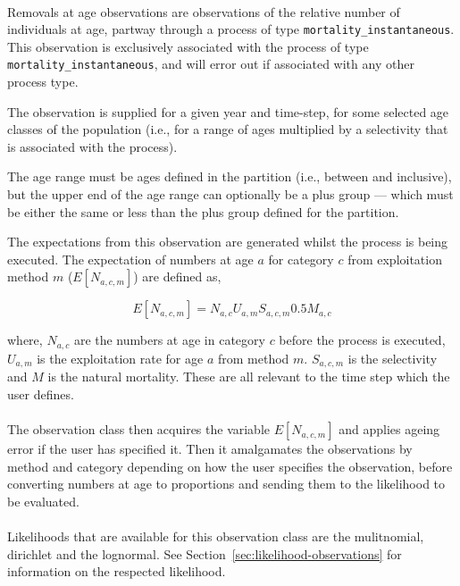 {{{{\begin{itemize}
\paragraph*{\label{sec:removals-by-age}}	
Removals at age observations are observations of the relative number of individuals at age, partway through a process of type \texttt{mortality\_instantaneous}. This observation is exclusively associated with the process of type \texttt{mortality\_instantaneous}, and will error out if associated with any other process type.

The observation is supplied for a given year and time-step, for some selected age classes of the population (i.e., for a range of ages multiplied by a selectivity that is associated with the process).

The age range must be ages defined in the partition (i.e., between  and  inclusive), but the upper end of the age range can optionally be a plus group --- which must be either the same or less than the plus group defined for the partition. 

The expectations from this observation are generated whilst the process is being executed. The expectation of numbers at age $a$ for category $c$ from exploitation method $m$ ($E[N_{a,c,m}]$) are defined as,


\begin{equation}
E[N_{a,c,m}] = N_{a,c} U_{a,m} S_{a,c,m} 0.5 M_{a,c}
\end{equation}

where, $N_{a,c}$ are the numbers at age in category $c$ before the process is executed, $U_{a,m}$ is the exploitation rate for age $a$ from method $m$. $S_{a,c,m}$ is the selectivity and $M$ is the natural mortality. These are all relevant to the time step which the user defines.
\\\\
The observation class then acquires the variable $E[N_{a,c,m}]$ and applies ageing error if the user has specified it. Then it amalgamates the observations by method and category depending on how the user specifies the observation, before converting numbers at age to proportions and sending them to the likelihood to be evaluated.
\\\\
Likelihoods that are available for this observation class are the mulitnomial, dirichlet and the lognormal. See Section~\ref{sec:likelihood-observations} for information on the respected likelihood.
\\\\

\end{itemize}}}}}
